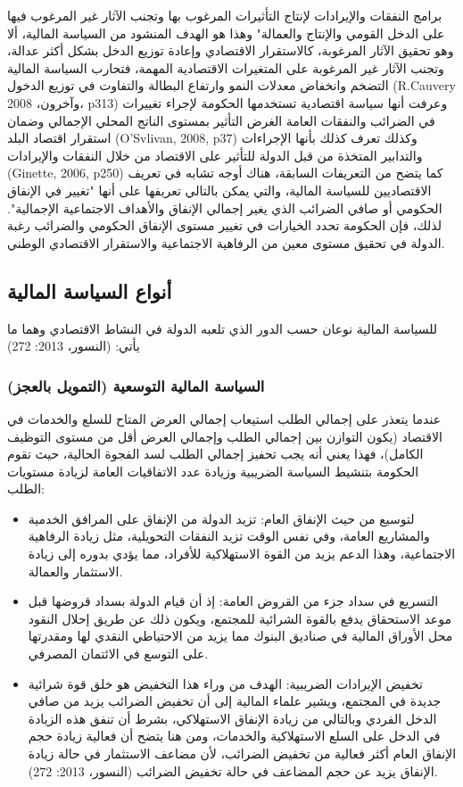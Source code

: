 \documentclass[10pt,a4paper]{report}
\begin{document}
\begin{doublespacing}
برامج النفقات والإيرادات لإنتاج التأثيرات المرغوب بها وتجنب الآثار غير المرغوب فيها على الدخل القومي والإنتاج والعمالة" وهذا هو الهدف المنشود من السياسة المالية، ألا وهو تحقيق الآثار المرغوبة، كالاستقرار الاقتصادي وإعادة توزيع الدخل بشكل أكثر عدالة، وتجنب الآثار غير المرغوبة على المتغيرات الاقتصادية المهمة، فتحارب السياسة المالية التضخم وانخفاض معدلات النمو وارتفاع البطالة والتفاوت في توزيع الدخول (R.Cauvery وآخرون، 2008، p313) وعرفت أنها سياسة اقتصادية تستخدمها الحكومة لإجراء تغييرات في الضرائب والنفقات العامة الغرض التأثير بمستوى الناتج المحلي الإجمالي وضمان استقرار اقتصاد البلد (O'Svlivan, 2008, p37) وكذلك تعرف كذلك بأنها الإجراءات والتدابير المتخذة من قبل الدولة للتأثير على الاقتصاد من خلال النفقات والإيرادات (Ginette, 2006, p250) كما يتضح من التعريفات السابقة، هناك أوجه تشابه في تعريف الاقتصاديين للسياسة المالية، والتي يمكن بالتالي تعريفها على أنها "تغيير في الإنفاق الحكومي أو صافي الضرائب الذي يغير إجمالي الإنفاق والأهداف الاجتماعية الإجمالية". لذلك، فإن الحكومة تحدد الخيارات في تغيير مستوى الإنفاق الحكومي والضرائب رغبة الدولة في تحقيق مستوى معين من الرفاهية الاجتماعية والاستقرار الاقتصادي الوطني.
\subsection{أنواع السياسة المالية}
للسياسة المالية نوعان حسب الدور الذي تلعبه الدولة في النشاط الاقتصادي وهما ما يأتي: (النسور، 2013: 272)
\subsubsection{السياسة المالية التوسعية (التمويل بالعجز)}
عندما يتعذر على إجمالي الطلب استيعاب إجمالي العرض المتاح للسلع والخدمات في الاقتصاد (يكون التوازن بين إجمالي الطلب وإجمالي العرض أقل من مستوى التوظيف الكامل)، فهذا يعني أنه يجب تحفيز إجمالي الطلب لسد الفجوة الحالية، حيث تقوم الحكومة بتنشيط السياسة الضريبية وزيادة عدد الاتفاقيات العامة لزيادة مستويات الطلب:
\begin{itemize}
	\item لتوسيع من حيث الإنفاق العام: تزيد الدولة من الإنفاق على المرافق الخدمية والمشاريع العامة، وفي نفس الوقت تزيد النفقات التحويلية، مثل زيادة الرفاهية الاجتماعية، وهذا الدعم يزيد من القوة الاستهلاكية للأفراد، مما يؤدي بدوره إلى زيادة الاستثمار والعمالة.
	\item التسريع في سداد جزء من القروض العامة: إذ أن قيام الدولة بسداد قروضها قبل موعد الاستحقاق يدفع بالقوة الشرائية للمجتمع، ويكون ذلك عن طريق إحلال النقود محل الأوراق المالية في صناديق البنوك مما يزيد من الاحتياطي النقدي لها ومقدرتها على التوسع في الائتمان المصرفي.
	\item تخفيض الإيرادات الضريبية: الهدف من وراء هذا التخفيض هو خلق قوة شرائية جديدة في المجتمع، ويشير علماء المالية إلى أن تخفيض الضرائب يزيد من صافي الدخل الفردي وبالتالي من زيادة الإنفاق الاستهلاكي، بشرط أن تنفق هذه الزيادة في الدخل على السلع الاستهلاكية والخدمات، ومن هنا يتضح أن فعالية زيادة حجم الإنفاق العام أكثر فعالية من تخفيض الضرائب، لأن مضاعف الاستثمار في حالة زيادة الإنفاق يزيد عن حجم المضاعف في حالة تخفيض الضرائب {(النسور، 2013: 272)}.
\end{itemize}

\end{doublespacing}
\end{document}
